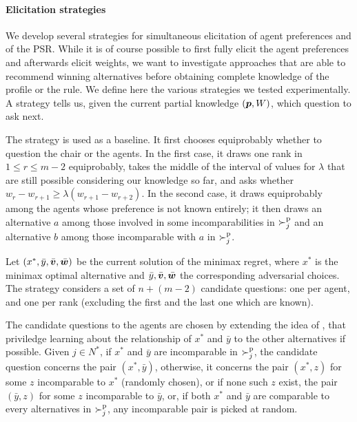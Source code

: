\documentclass{article}
\begin{document}
\paragraph{Elicitation strategies}
We develop several strategies for simultaneous elicitation of agent preferences and of the PSR.
While it is of course possible to first fully elicit the agent preferences and afterwards elicit weights, we want to investigate approaches that are able to recommend winning alternatives before obtaining complete knowledge of the profile or the rule.
We define here the various strategies we tested experimentally. A strategy tells us, given the current partial knowledge $({\bm{p}}, W)$, which question to ask next.

The  strategy is used as a baseline. %
It first chooses equiprobably whether to question the chair or the agents. In the first case, it draws one rank in $1 ≤ r ≤ m-2$ equiprobably, takes the middle of the interval of values for $\lambda$ that are still possible considering our knowledge so far, and asks whether $w_r - w_{r+1} ≥ \lambda (w_{r+1} - w_{r+2})$.
In the second case, it draws equiprobably among the agents whose preference is not known entirely; it then draws an alternative $a$ among those involved in some incomparabilities in $\succ^\text{p}_j$ and an alternative $b$ among those incomparable with $a$ in $\succ^\text{p}_j$.

Let $(x^{*},\bar{y}, \bar{\bm{v}}, \bar{\bm{w}})$ be the current solution of the minimax regret, where $x^{*}$ is the minimax optimal alternative and $\bar{y}, \bar{\bm{v}}, \bar{\bm{w}}$ the corresponding adversarial choices. 
The  strategy considers a set of $n + (m-2)$ candidate questions: one per agent, and one per rank (excluding the first and the last one which are known).

The candidate questions to the agents are chosen by extending the idea of \citet{Lu2011}, that priviledge learning about the relationship of $x^*$ and $\bar{y}$ to the other alternatives if possible.
	Given $j \in N^*$, if $x^*$ and $\bar{y}$ are incomparable in $\succ^\text{p}_j$, the candidate question concerns the pair $(x^*, \bar{y})$, otherwise, %
	it concerns the pair $(x^*, z)$ for some $z$ incomparable to $x^*$ (randomly chosen), or if none such $z$ exist, the pair $(\bar{y}, z)$ for some $z$ incomparable to $\bar{y}$, or, if both $x^*$ and $\bar{y}$ are comparable to every alternatives in $\succ^\text{p}_j$, any incomparable pair is picked at random. 
\end{document}
